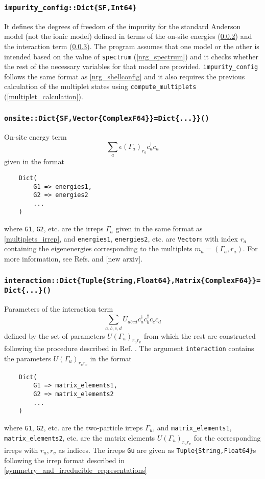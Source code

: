 \documentclass[notitlepage]{article}
\begin{document}
\subsubsection{\texttt{impurity\_config::Dict\{SF,Int64\}}}
\label{nrg_impurityconfig}
It defines the degrees of freedom of the impurity for the
standard Anderson model (not the ionic model) defined in
terms of the on-site energies (\ref{nrg_onsite}) and the
interaction term (\ref{nrg_interaction}). The program
assumes that one model or the other is intended based on the
value of \texttt{spectrum} (\ref{nrg_spectrum}) and it
checks whether the rest of the necessary variables for that
model are provided. \texttt{impurity\_config} follows the
same format as \ref{nrg_shellconfig} and it also requires
the previous calculation of the multiplet states using
\texttt{compute\_multiplets} (\ref{multiplet_calculation}).

\subsubsection{\texttt{onsite::Dict\{SF,Vector\{ComplexF64\}\}=Dict\{...\}\}()}}
\label{nrg_onsite}
On-site energy term 
\begin{equation}
    \sum_a
    \epsilon(\Gamma_a)_{r_a}
    c^\dagger_a c_a
\end{equation}
given in the format
\begin{verbatim}
    Dict(
        G1 => energies1,
        G2 => energies2
        ...
    )
\end{verbatim}
where \texttt{G1}, \texttt{G2}, etc. are the irreps
$\Gamma_a$ given in the same format as
\ref{multiplets_irrep}, and \texttt{energies1},
\texttt{energies2}, etc. are \texttt{Vector}s with index
$r_a$ containing the eigenenergies corresponding to the
multiplets $m_a=(\Gamma_a,r_a)$. For more information, see
Refs. \cite{calvo-fernandez2024} and [new arxiv].

\subsubsection{\texttt{interaction::Dict\{Tuple\{String,Float64\},Matrix\{ComplexF64\}\}=Dict\{...\}()}}
\label{nrg_interaction}
Parameters of the interaction term
\begin{equation}
    \sum_{a,b,c,d} U_{abcd} 
    c^\dagger_a c^\dagger_b
    c_c c_d
\end{equation}
defined by the set of parameters $U(\Gamma_u)_{r_u r_v}$
from which the rest are constructed following the procedure
described in Ref. \cite{calvo-fernandez2024}. The argument
\texttt{interaction} contains the parameters $U(\Gamma_u)_{r_u r_v}$
in the format
\begin{verbatim}
    Dict(
        G1 => matrix_elements1,
        G2 => matrix_elements2
        ...
    )
\end{verbatim}
where \texttt{G1}, \texttt{G2}, etc. are the two-particle
irreps $\Gamma_u$, and
\texttt{matrix\_elements1}, \texttt{matrix\_elements2}, etc. are the matrix elements
$U(\Gamma_u)_{r_u r_v}$ for the corresponding irreps with
$r_u,r_v$ as indices. The irreps \texttt{Gu} are given as 
\texttt{Tuple\{String,Float64\}}s following the irrep format
described in \ref{symmetry_and_irreducible_representations}
\end{document}
